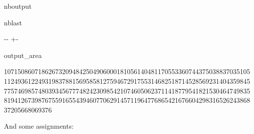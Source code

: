 \documentclass[letterpaper,10pt,english]{sphinxmanual}
\begin{document}
\begin{sphinxuseclass}{nboutput}
\begin{sphinxuseclass}{nblast}
{

\kern-\sphinxverbatimsmallskipamount\kern-\baselineskip
\kern+\FrameHeightAdjust\kern-\fboxrule
\vspace{\nbsphinxcodecellspacing}

\begin{sphinxuseclass}{output_area}
\begin{sphinxuseclass}{}


\begin{sphinxVerbatim}[commandchars=\\\{\}]
\llap{\color{nbsphinxout}[5]:\,\hspace{\fboxrule}\hspace{\fboxsep}}10715086071862673209484250490600018105614048117055336074437503883703510511249361224931983788156958581275946729175531468251871452856923140435984577574698574803934567774824230985421074605062371141877954182153046474983581941267398767559165543946077062914571196477686542167660429831652624386837205668069376
\end{sphinxVerbatim}



\end{sphinxuseclass}
\end{sphinxuseclass}
}

\end{sphinxuseclass}
\end{sphinxuseclass}
\sphinxAtStartPar
And some assignments:
\end{document}
